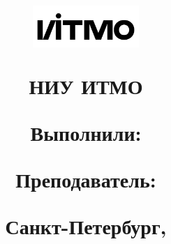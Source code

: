 \begin{titlepage}

\thispagestyle{empty}

\title{

\includegraphics[width=4cm]{images/ITMO_logo.png} 

\vspace{1em}
НИУ ИТМО 
\vspace{4em}

\begin{center}
\large\textsc{\textbf{\name}}

\vspace{1em}
\subname

\end{center}

\vspace{3em}

\begin{flushright}
\normalsize{ 
Выполнили: \\ \textbf{\madeby} 

Преподаватель: \\ \textbf{\teacher} 
}
\end{flushright}	

\vfill

\begin{center}
\small{Санкт-Петербург, \the\year}
\end{center}
}


\author{}
\date{}
\maketitle
\thispagestyle{empty}
\end{titlepage}